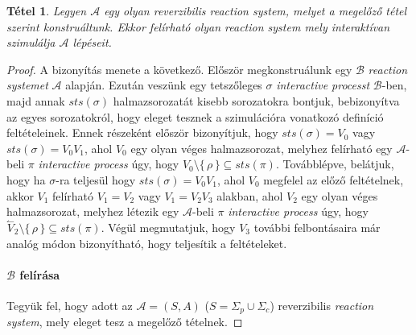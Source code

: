 \documentclass[12pt]{article}
\theoremstyle{definition}
\theoremstyle{remark}
\theoremstyle{plain}
\newtheorem*{theorem*}{Tétel}
\theoremstyle{plain}
\newcommand{\backwardhat}{\overset{\leftharpoonup}}
\begin{document}
    \begin{theorem*}
        Legyen $\mathscr{A}$ egy olyan reverzibilis \textit{reaction system}, melyet a megelőző tétel szerint konstruáltunk. Ekkor felírható olyan \textit{reaction system} mely interaktívan szimulálja $\mathscr{A}$ lépéseit.
    \end{theorem*}

    \begin{proof}
        A bizonyítás menete a következő. Először megkonstruálunk egy $\mathscr{B}$ \textit{reaction systemet} $\mathscr{A}$ alapján. Ezután veszünk egy tetszőleges $\sigma$ \textit{interactive processt} $\mathscr{B}$-ben, majd annak $\textit{sts}(\sigma)$ halmazsorozatát kisebb sorozatokra bontjuk, bebizonyítva az egyes sorozatokról, hogy eleget tesznek a szimulációra vonatkozó definíció feltételeinek. Ennek részeként először bizonyítjuk, hogy $\textit{sts}(\sigma)=V_{0}$ vagy $\textit{sts}(\sigma)=V_{0}V_{1}$, ahol $V_{0}$ egy olyan véges halmazsorozat, melyhez felírható egy $\mathscr{A}$-beli $\pi$ \textit{interactive process} úgy, hogy $V_{0} \setminus \{ \, \rho \, \} \subseteq \textit{sts}(\pi)$. Továbblépve, belátjuk, hogy ha $\sigma$-ra teljesül hogy $\textit{sts}(\sigma)=V_{0}V_{1}$, ahol $V_{0}$ megfelel az előző feltételnek, akkor $V_{1}$ felírható $V_{1}=V_{2}$ vagy $V_{1}=V_{2}V_{3}$ alakban, ahol $V_{2}$ egy olyan véges halmazsorozat, melyhez létezik egy $\mathscr{A}$-beli $\pi$ \textit{interactive process} úgy, hogy $\backwardhat V_{2} \setminus \{ \,\rho\, \} \subseteq \textit{sts}(\pi)$. Végül megmutatjuk, hogy $V_{3}$ további felbontásaira már analóg módon bizonyítható, hogy teljesítik a feltételeket.

        \paragraph{$\mathscr{B}$ felírása}
        Tegyük fel, hogy adott az $\mathscr{A} = (S, A)$ ($S = \Sigma_{p} \cup \Sigma_{c}$) reverzibilis \textit{reaction system}, mely eleget tesz a megelőző tételnek.
        

\end{proof}
\end{document}
